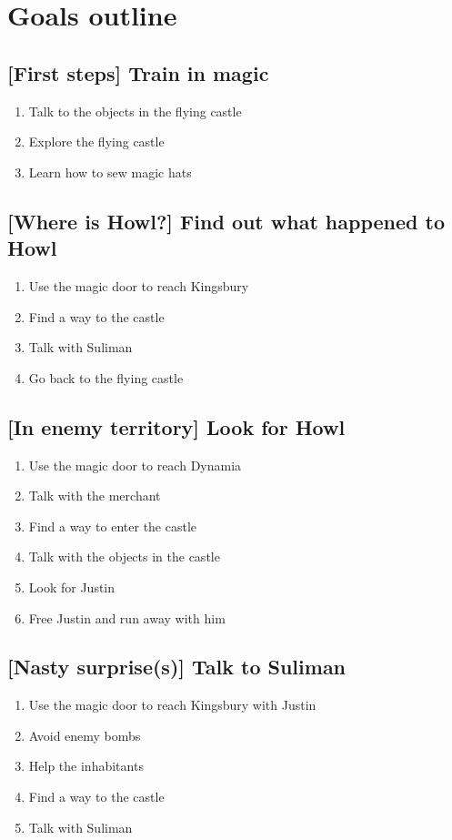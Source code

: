 \section{Goals outline}

\subsection{[First steps] Train in magic}
\begin{enumerate}
\item Talk to the objects in the flying castle
\item Explore the flying castle
\item Learn how to sew magic hats
\end{enumerate}

\subsection{[Where is Howl?] Find out what happened to Howl}
\begin{enumerate}
\item Use the magic door to reach Kingsbury
\item Find a way to the castle
\item Talk with Suliman
\item Go back to the flying castle
\end{enumerate}

\subsection{[In enemy territory] Look for Howl}
\begin{enumerate}
\item Use the magic door to reach Dynamia
\item Talk with the merchant
\item Find a way to enter the castle
\item Talk with the objects in the castle
\item Look for Justin
\item Free Justin and run away with him
\end{enumerate}

\subsection{[Nasty surprise(s)] Talk to Suliman}
\begin{enumerate}
\item Use the magic door to reach Kingsbury with Justin
\item Avoid enemy bombs
\item Help the inhabitants
\item Find a way to the castle
\item Talk with Suliman
\end{enumerate}

